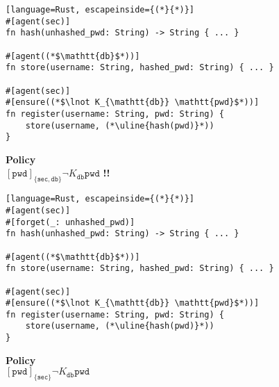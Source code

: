 \documentclass[14pt, aspectratio=169, xcolor={dvipsnames}]{beamer}
\begin{document}
\begin{frame}[fragile, b]
  \begin{lstlisting}[language=Rust, escapeinside={(*}{*)}]
#[agent(sec)]
fn hash(unhashed_pwd: String) -> String { ... }

#[agent((*$\mathtt{db}$*))]
fn store(username: String, hashed_pwd: String) { ... }

#[agent(sec)]
#[ensure((*$\lnot K_{\mathtt{db}} \mathtt{pwd}$*))]
fn register(username: String, pwd: String) {
    store(username, (*\uline{hash(pwd)}*))
}
  \end{lstlisting}

  \pause
  \begin{center}
    \textbf{Policy} \\
    $[\mathtt{pwd}]_{\{\mathtt{sec}, \mathtt{db}\}} \lnot K_{\mathtt{db}} \mathtt{pwd}$
      {\color{red}\bfseries !!}
  \end{center}
\end{frame}

\begin{frame}[fragile, b]
  \begin{lstlisting}[language=Rust, escapeinside={(*}{*)}]
#[agent(sec)]
#[forget(_: unhashed_pwd)]
fn hash(unhashed_pwd: String) -> String { ... }

#[agent((*$\mathtt{db}$*))]
fn store(username: String, hashed_pwd: String) { ... }

#[agent(sec)]
#[ensure((*$\lnot K_{\mathtt{db}} \mathtt{pwd}$*))]
fn register(username: String, pwd: String) {
    store(username, (*\uline{hash(pwd)}*))
}
  \end{lstlisting}

  \pause
  \begin{center}
    \textbf{Policy} \\
    $[\mathtt{pwd}]_{\{\mathtt{sec}\}} \lnot K_{\mathtt{db}} \mathtt{pwd}$
      {\color{ForestGreen}\bfseries \checkmark}
  \end{center}
\end{frame}
\end{document}
